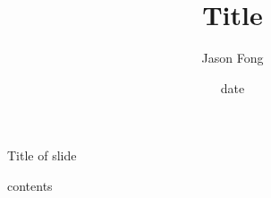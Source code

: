 \documentclass[11pt]{beamer}
\title{Title}
\author{Jason Fong}
\institute
{\inst{}University of Toronto}
\date{date}
\begin{document}
\maketitle

\begin{frame}{Title of slide}

contents

\end{frame}
\end{document}
